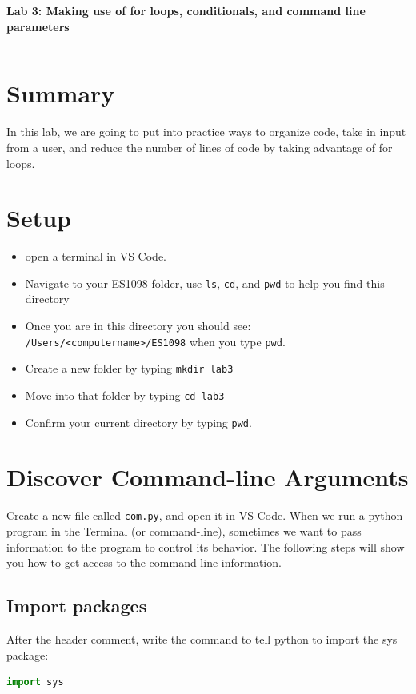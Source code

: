 \documentclass[12pt]{article}
\begin{document}
\begin{center}
  {\Large {\bf Lab 3: Making use of for loops, conditionals, and command line parameters}}
  
\end{center}

\vspace{5pt}
\hrule
\vspace{5pt}

\section{Summary}
In this lab, we are going to put into practice ways to organize code, take in input from a user, and reduce the number of lines of code by taking advantage of for loops.

\section{Setup}
\begin{itemize}
  \item open a terminal in VS Code. 
  \item Navigate to your ES1098 folder, use \texttt{ls}, \texttt{cd}, and \texttt{pwd} to help you find this directory
  \item Once you are in this directory you should see: \texttt{/Users/<computername>/ES1098} when you type \texttt{pwd}.
  \item Create a new folder by typing \texttt{mkdir lab3}
  \item Move into that folder by typing \texttt{cd lab3}
  \item Confirm your current directory by typing \texttt{pwd}.
\end{itemize}

\section{Discover Command-line Arguments}
Create a new file called \texttt{com.py}, and open it in VS Code. 
When we run a python program in the Terminal (or command-line), sometimes we want to pass information to the program to control its behavior. The following steps will show you how to get access to the command-line information.

\subsection{Import packages}
After the header comment, write the command to tell python to import the sys package:
\begin{lstlisting}[language=Python]
import sys
\end{lstlisting}
  
\end{document}
